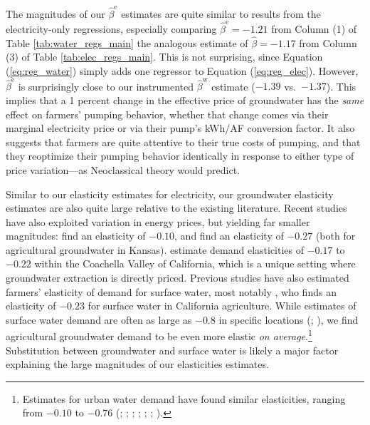 The magnitudes of our $\hat\beta^{\text{e}}$ estimates are quite similar to results from the electricity-only regressions, especially comparing $\hat\beta^{\text{e}} = -1.21$ from Column (1) of Table \ref{tab:water_regs_main} the analogous estimate of $\hat\beta = -1.17$ from Column (3) of Table \ref{tab:elec_regs_main}. This is not surprising, since Equation (\ref{eq:reg_water}) simply adds one regressor to Equation (\ref{eq:reg_elec}). However, $\hat\beta^{\text{e}}$ is surprisingly close to our instrumented $\hat\beta^{\text{w}}$ estimate ($-1.39$ vs.\ $-1.37$). This implies that a 1 percent change in the effective price of groundwater has the \emph{same} effect on farmers' pumping behavior, whether that change comes via their marginal electricity price or via their pump's kWh/AF conversion factor. It also suggests that farmers are quite attentive to their true costs of pumping, and that they reoptimize their pumping behavior identically in response to either type of price variation---as Neoclassical theory would predict.

Similar to our elasticity estimates for electricity, our groundwater elasticity estimates are also quite large relative to the existing literature. Recent studies have also exploited variation in energy prices, but yielding far smaller magnitudes: \textcite{hendricks2012} find an elasticity of $-0.10$, and \textcite{pfeiffer2014} find an elasticity of $-0.27$ (both for agricultural groundwater in Kansas). \textcite{bruno2018} estimate demand elasticities of $-0.17$ to $-0.22$ within the Coachella Valley of California, which is a unique setting where groundwater extraction is directly priced. Previous studies have also estimated farmers' elasticity of demand for surface water, most notably 
\textcite{hagerty2018}, who finds an elasticity of $-0.23$ for surface water in California agriculture. While estimates of surface water demand are often as large as $-0.8$ in specific locations (\textcite{schoengold2006}; \textcite{hagerty2018}), we find agricultural groundwater demand to be even more elastic \emph{on average}.\footnote{
Estimates for urban water demand have found similar elasticities, ranging from $-0.10$ to $-0.76$ (\textcite{nataraj2011}; \textcite{ito2013}; \textcite{baerenklau2014}; \textcite{wichman2014}; \textcite{buck2016}; \textcite{wichman2016}; \textcite{hagerty2018}).
}
Substitution between groundwater and surface water is likely a major factor explaining the large magnitudes of our elasticities estimates.

